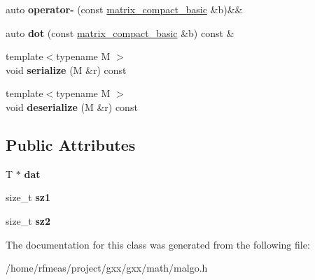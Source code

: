 \begin{DoxyCompactItemize}
\item 
auto {\bfseries operator-\/} (const \hyperlink{classmalgo_1_1matrix__compact__basic}{matrix\+\_\+compact\+\_\+basic} \&b)\&\&\hypertarget{classmalgo_1_1matrix__compact__basic_a1996092d1367b54d5e417f59ce9c49c7}{}\label{classmalgo_1_1matrix__compact__basic_a1996092d1367b54d5e417f59ce9c49c7}

\item 
auto {\bfseries dot} (const \hyperlink{classmalgo_1_1matrix__compact__basic}{matrix\+\_\+compact\+\_\+basic} \&b) const \&\hypertarget{classmalgo_1_1matrix__compact__basic_a98caebdd0e6c3d492303605fbeed1570}{}\label{classmalgo_1_1matrix__compact__basic_a98caebdd0e6c3d492303605fbeed1570}

\item 
{\footnotesize template$<$typename M $>$ }\\void {\bfseries serialize} (M \&r) const \hypertarget{classmalgo_1_1matrix__compact__basic_a56d9d8ddfc794b090dfc53ae687e9762}{}\label{classmalgo_1_1matrix__compact__basic_a56d9d8ddfc794b090dfc53ae687e9762}

\item 
{\footnotesize template$<$typename M $>$ }\\void {\bfseries deserialize} (M \&r) const \hypertarget{classmalgo_1_1matrix__compact__basic_ab6ecb8c18180de1efaf3bf42fb5a60da}{}\label{classmalgo_1_1matrix__compact__basic_ab6ecb8c18180de1efaf3bf42fb5a60da}

\end{DoxyCompactItemize}
\subsection*{Public Attributes}
\begin{DoxyCompactItemize}
\item 
T $\ast$ {\bfseries dat}\hypertarget{classmalgo_1_1matrix__compact__basic_ac757b457f71d6e687612424cee168108}{}\label{classmalgo_1_1matrix__compact__basic_ac757b457f71d6e687612424cee168108}

\item 
size\+\_\+t {\bfseries sz1}\hypertarget{classmalgo_1_1matrix__compact__basic_a0dced4efcb799136e928062b4e7fd1c6}{}\label{classmalgo_1_1matrix__compact__basic_a0dced4efcb799136e928062b4e7fd1c6}

\item 
size\+\_\+t {\bfseries sz2}\hypertarget{classmalgo_1_1matrix__compact__basic_abf07571e5602284b55aa18c37ad79855}{}\label{classmalgo_1_1matrix__compact__basic_abf07571e5602284b55aa18c37ad79855}

\end{DoxyCompactItemize}


The documentation for this class was generated from the following file\+:\begin{DoxyCompactItemize}
\item 
/home/rfmeas/project/gxx/gxx/math/malgo.\+h\end{DoxyCompactItemize}
